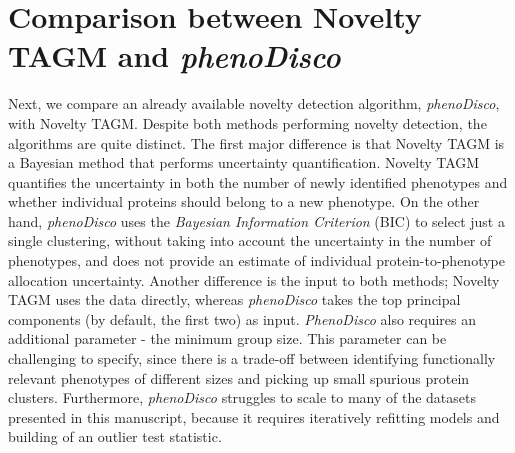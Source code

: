 \documentclass[12pt,english]{article}
\begin{document}
\section*{Comparison between Novelty TAGM and \textit{phenoDisco}}
Next, we compare an already available novelty detection algorithm, \textit{phenoDisco}, with Novelty TAGM. Despite both methods performing novelty detection, the algorithms
are quite distinct. The first major difference is that Novelty TAGM is a Bayesian 
method that performs uncertainty quantification. Novelty TAGM quantifies the uncertainty in both the number of newly identified phenotypes and whether individual proteins should belong to a new phenotype. On the other hand, \textit{phenoDisco} uses the \textit{Bayesian Information Criterion} (BIC) to select just a single clustering, without taking into account the uncertainty in the number of phenotypes, and does not provide an estimate of individual protein-to-phenotype allocation uncertainty. Another difference is the input to both methods; Novelty TAGM uses the data directly, whereas \textit{phenoDisco} takes the top principal components (by default, the first two) as input. \textit{PhenoDisco} also requires an additional parameter - the minimum group size. This parameter can be challenging to specify, since there is a trade-off between identifying functionally relevant phenotypes of different sizes and picking up small spurious protein clusters. Furthermore, \textit{phenoDisco} struggles to scale to many of the datasets presented in this manuscript, because it requires iteratively refitting models and building of an outlier test statistic. 
\end{document}
